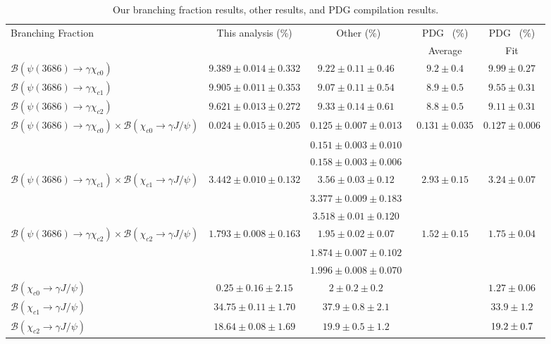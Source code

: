 \documentclass[aps,prd,twocolumn,showpacs,floatfix,byrevtex]{revtex4-1}
\newcommand\T{\rule{0pt}{2.6ex}}       %
\newcommand\B{\rule[-1.2ex]{0pt}{0pt}} %
\begin{document}
\begin{table*}[htb!]
\centering
\caption{Our branching fraction results, other results, and PDG
  compilation results.}
\vspace{0.05 in}
\begin{tabular}{l|c|c|c|c} \hline \hline
\T Branching Fraction & This analysis (\%) & Other (\%) & PDG~\cite{PDG16}
(\%)& PDG~\cite{PDG16} (\%)\\ 
 & & & Average & Fit \B \\ \hline
\T $\mathcal{B}(\psi(3686) \to \gamma \chi_{c0})$ & $9.389 \pm 0.014 \pm 0.332$ &
$9.22\pm0.11\pm0.46$~\cite{cleo04} & $9.2\pm0.4$ &$9.99 \pm 0.27$\\  
$\mathcal{B}(\psi(3686) \to \gamma \chi_{c1})$ & $9.905 \pm 0.011 \pm 0.353$ &
$9.07 \pm 0.11\pm 0.54$~\cite{cleo04} & $ 8.9 \pm 0.5$ & $9.55 \pm 0.31$\\  
$\mathcal{B}(\psi(3686) \to \gamma \chi_{c2})$ &$ 9.621 \pm 0.013\pm0.272 $ &
$9.33\pm0.14\pm0.61$~\cite{cleo04} & $8.8\pm0.5$ &$9.11 \pm 0.31$ \B \\ \hline 
\T $\mathcal{B}(\psi(3686) \to \gamma \chi_{c0})\times
\mathcal{B}(\chi_{c0} \to \gamma J/\psi)$ & $ 0.024 \pm 0.015 \pm
0.205$& $0.125 \pm 0.007 \pm 0.013$~\cite{mendez}& $ 0.131\pm0.035$ &
$0.127\pm0.006$ \\  
 & & $0.151 \pm 0.003 \pm 0.010$~\cite{xiaorui}& & \\  
   & & $0.158\pm0.003\pm0.006$~\cite{bam158} & & \\
$\mathcal{B}(\psi(3686) \to \gamma \chi_{c1})\times
\mathcal{B}(\chi_{c1} \to \gamma J/\psi)$ & $ 3.442 \pm 0.010 \pm
0.132$& $3.56 \pm 0.03 \pm 0.12$~\cite{mendez}& $2.93\pm0.15$ & $ 3.24\pm0.07$\\  
 & & $3.377 \pm 0.009 \pm 0.183$~\cite{xiaorui}& & \\  
   & & $3.518\pm0.01\pm0.120$~\cite{bam158} & & \\
$\mathcal{B}(\psi(3686) \to \gamma \chi_{c2})\times
\mathcal{B}(\chi_{c2} \to \gamma J/\psi)$ & $ 1.793 \pm 0.008 \pm
0.163$ & $1.95\pm0.02\pm0.07$~\cite{mendez}& $1.52\pm0.15$ & $1.75 \pm 0.04$ \\ 
& & $1.874\pm0.007\pm0.102$~\cite{xiaorui}& &  \\ 
   & & $1.996\pm0.008\pm0.070$~\cite{bam158} & & \B \\ \hline
\T $\mathcal{B}(\chi_{c0} \to \gamma J/\psi)$ & $0.25 \pm 0.16 \pm 2.15$ & $2 \pm 0.2 \pm 0.2$~\cite{adam05a} && $1.27
\pm 0.06 $\\  
$\mathcal{B}(\chi_{c1} \to \gamma J/\psi)$ & $34.75 \pm 0.11 \pm 1.70$ & $37.9 \pm 0.8 \pm 2.1$~\cite{adam05a} && $33.9
\pm 1.2 $\\  
$\mathcal{B}(\chi_{c2} \to \gamma J/\psi)$ & $18.64 \pm 0.08 \pm 1.69$ & $19.9 \pm 0.5 \pm 1.2$~\cite{adam05a} &&
$19.2 \pm 0.7 \B $\\  
  \hline \hline
\end{tabular}
\label{final results}
\end{table*}
\end{document}
